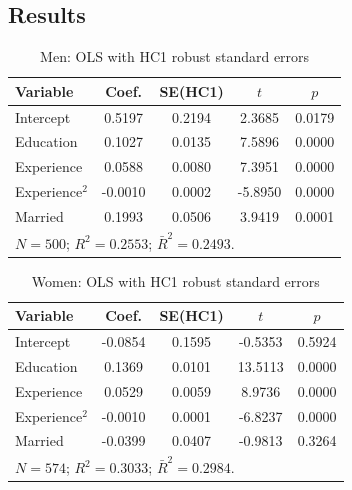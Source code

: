 \documentclass[12pt]{article}
\begin{document}
\subsection*{Results}

\begin{table}[htbp]
  \centering
  \caption{Men: OLS with HC1 robust standard errors}
  \label{tab:q2_men}
  \small
  \begin{tabular}{l
                  S[table-format=1.4]
                  S[table-format=1.4]
                  S[table-format=2.4]
                  S[table-format=1.4]}
    \toprule
    Variable & {Coef.} & {SE(HC1)} & {$t$} & {$p$} \\
    \midrule
    Intercept        & 0.5197 & 0.2194 &  2.3685 & 0.0179 \\
    Education        & 0.1027 & 0.0135 &  7.5896 & 0.0000 \\
    Experience       & 0.0588 & 0.0080 &  7.3951 & 0.0000 \\
    Experience$^{2}$ & -0.0010& 0.0002 & -5.8950 & 0.0000 \\
    Married          & 0.1993 & 0.0506 &  3.9419 & 0.0001 \\
    \midrule
     \\
    \bottomrule
  \end{tabular}
\end{table}

\begin{table}[htbp]
  \centering
  \caption{Women: OLS with HC1 robust standard errors}
  \label{tab:q2_women}
  \small
  \begin{tabular}{l
                  S[table-format=1.4]
                  S[table-format=1.4]
                  S[table-format=2.4]
                  S[table-format=1.4]}
    \toprule
    Variable & {Coef.} & {SE(HC1)} & {$t$} & {$p$} \\
    \midrule
    Intercept        & -0.0854 & 0.1595 & -0.5353 & 0.5924 \\
    Education        & 0.1369  & 0.0101 & 13.5113 & 0.0000 \\
    Experience       & 0.0529  & 0.0059 &  8.9736 & 0.0000 \\
    Experience$^{2}$ & -0.0010 & 0.0001 & -6.8237 & 0.0000 \\
    Married          & -0.0399 & 0.0407 & -0.9813 & 0.3264 \\
    \midrule
     \\
    \bottomrule
  \end{tabular}
\end{table}
\end{document}
